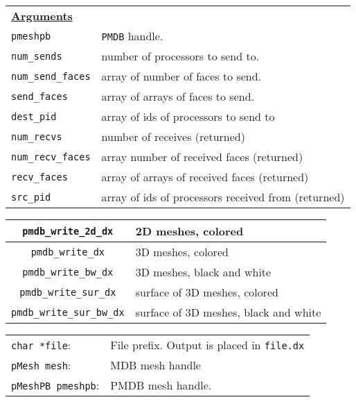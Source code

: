{\newpage
\clearpage
\samepage \begin{tabular}{p{1.0in}p{4.9in}}
{\bf \underline{Arguments}} & \\  

{\tt pmeshpb}          &  \verb$PMDB$ handle. \\  
{\tt num\_sends}       & number of processors to send to. \\  
{\tt num\_send\_faces} & array of number of faces to send. \\  
{\tt send\_faces}      & array of arrays of faces to send. \\  
{\tt dest\_pid}        & array of ids of processors to send to \\  
{\tt num\_recvs}       & number of receives (returned) \\  
{\tt num\_recv\_faces} & array number of received faces (returned) \\  
{\tt recv\_faces }     & array of arrays of received faces (returned) \\  
{\tt src\_pid }        & array of ids of processors received from (returned) \\  

\end{tabular}
}

{\newpage
\clearpage
\samepage \begin{tabular}{|c|l|} \hline 
{\tt pmdb\_write\_2d\_dx}       &  2D  meshes, colored                     \\ 
\hline 
{\tt pmdb\_write\_dx}           &  3D  meshes, colored                     \\ 
\hline 
{\tt pmdb\_write\_bw\_dx}       &  3D meshes, black and white              \\ 
\hline 
{\tt pmdb\_write\_sur\_dx}      &  surface of 3D meshes, colored           \\ 
\hline 
{\tt pmdb\_write\_sur\_bw\_dx}  &  surface of 3D meshes, black and white   \\ 
\hline 
\end{tabular}
}

{\newpage
\clearpage
\samepage \begin{tabular}%
{p{1.4in}p{4.0in}}
{\tt char    *file}:    &  File prefix.  Output is placed in \verb$file.dx$ \\ 
{\tt pMesh    mesh}:    &  MDB mesh handle      \\ 
{\tt pMeshPB  pmeshpb}: &  PMDB mesh handle.    \\ 
\end{tabular}
}



